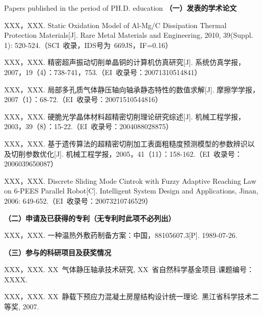 
 {Papers
published in the period of PH.D. education}
\noindent\textbf{（一）发表的学术论文}
\begin{publist}
\item	XXX，XXX. Static Oxidation Model of Al-Mg/C Dissipation Thermal Protection Materials[J]. Rare Metal Materials and Engineering, 2010, 39(Suppl. 1): 520-524.（SCI~收录，IDS号为~669JS，IF=0.16）
\item XXX，XXX. 精密超声振动切削单晶铜的计算机仿真研究[J]. 系统仿真学报，2007，19（4）：738-741，753.（EI~收录号：20071310514841）
\item XXX，XXX. 局部多孔质气体静压轴向轴承静态特性的数值求解[J]. 摩擦学学报，2007（1）：68-72.（EI~收录号：20071510544816）
\item XXX，XXX. 硬脆光学晶体材料超精密切削理论研究综述[J]. 机械工程学报，2003，39（8）：15-22.（EI~收录号：2004088028875）
\item XXX，XXX. 基于遗传算法的超精密切削加工表面粗糙度预测模型的参数辨识以及切削参数优化[J]. 机械工程学报，2005，41（11）：158-162.（EI~收录号：2006039650087）
\item XXX，XXX. Discrete Sliding Mode Cintrok with Fuzzy Adaptive Reaching Law on 6-PEES Parallel Robot[C]. Intelligent System Design and Applications, Jinan, 2006: 649-652.（EI~收录号：20073210746529）
\end{publist}

\noindent\textbf{（二）申请及已获得的专利（无专利时此项不必列出）}
\begin{publist}
\item XXX，XXX. 一种温热外敷药制备方案：中国，88105607.3[P]. 1989-07-26.
\end{publist}

\noindent\textbf{（三）参与的科研项目及获奖情况}
\begin{publist}
\item	XXX，XXX. XX~气体静压轴承技术研究, XX~省自然科学基金项目.课题编号：XXXX.
\item XXX，XXX. XX~静载下预应力混凝土房屋结构设计统一理论. 黑江省科学技术二等奖, 2007.
\end{publist}

